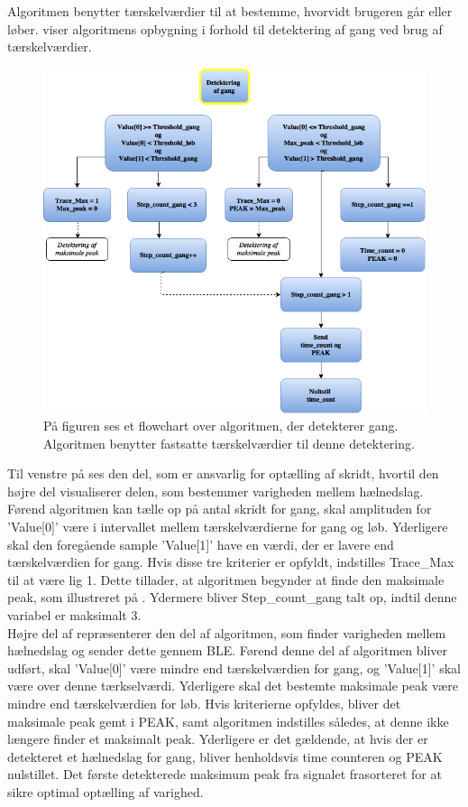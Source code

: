 Algoritmen benytter tærskelværdier til at bestemme, hvorvidt brugeren går eller løber.  viser algoritmens opbygning i forhold til detektering af gang ved brug af tærskelværdier.
\begin{figure}[H]
	\centering
	\includegraphics[scale=0.5]{figures/cDesign/gang_ckode_pseudo.png}
	\caption{På figuren ses et flowchart over algoritmen, der detekterer gang. Algoritmen benytter fastsatte tærskelværdier til denne detektering.}
	\label{fig:gang_pseudo}
\end{figure}\vspace{-0.25cm}
Til venstre på  ses den del, som er ansvarlig for optælling af skridt, hvortil den højre del visualiserer delen, som bestemmer varigheden mellem hælnedslag. Førend algoritmen kan tælle op på antal skridt for gang, skal amplituden for 'Value[0]' være i intervallet mellem tærskelværdierne for gang og løb. Yderligere skal den foregående sample 'Value[1]' have en værdi, der er lavere end tærskelværdien for gang. Hvis disse tre kriterier er opfyldt, indstilles Trace\_Max til at være lig 1. Dette tillader, at algoritmen begynder at finde den maksimale peak, som illustreret på . Ydermere bliver Step\_count\_gang talt op, indtil denne variabel er maksimalt 3. \\
Højre del af  repræsenterer den del af algoritmen, som finder varigheden mellem hælnedslag og sender dette gennem BLE. Førend denne del af algoritmen bliver udført, skal 'Value[0]' være mindre end tærskelværdien for gang, og 'Value[1]' skal være over denne tærkselværdi. Yderligere skal det bestemte maksimale peak være mindre end tærskelværdien for løb. Hvis kriterierne opfyldes, bliver det maksimale peak gemt i PEAK, samt algoritmen indstilles således, at denne ikke længere finder et maksimalt peak. Yderligere er det gældende, at hvis der er detekteret et hælnedslag for gang, bliver henholdsvis time counteren og PEAK nulstillet. Det første detekterede maksimum peak fra signalet frasorteret for at sikre optimal optælling af varighed. \\
